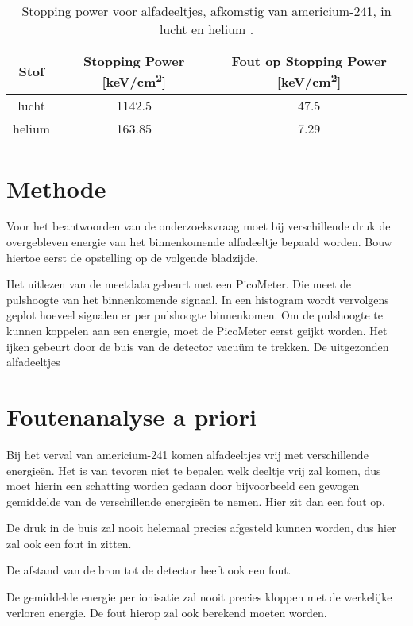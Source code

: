 \documentclass[11pt,a4paper]{article}
\begin{document}
\begin{table}
\caption{Stopping power voor alfadeeltjes, afkomstig van americium-241, in lucht \cite{StoppingPowerAir} en helium \cite{StoppingPowerHelium}.}
\centering
\begin{tabular}{SSS}
\toprule
{Stof} & {Stopping Power [\si{keV/cm^2}]} & {Fout op Stopping Power [\si{keV/cm^2}]} \\
\midrule
{lucht} &  1142.5 & 47.5\\
{helium} &  163.85 & 7.29\\
\bottomrule
\end{tabular}
\label{tab:table_2}
\end{table}

\section{Methode}
Voor het beantwoorden van de onderzoeksvraag moet bij verschillende druk de overgebleven energie van het binnenkomende alfadeeltje bepaald worden. Bouw hiertoe eerst de opstelling op de volgende bladzijde.\par
Het uitlezen van de meetdata gebeurt met een PicoMeter. Die meet de pulshoogte van het binnenkomende signaal. In een histogram wordt vervolgens geplot hoeveel signalen er per pulshoogte binnenkomen. Om de pulshoogte te kunnen koppelen aan een energie, moet de PicoMeter eerst geijkt worden.
Het ijken gebeurt door de buis van de detector vacuüm te trekken. De uitgezonden alfadeeltjes

\section{Foutenanalyse a priori}
Bij het verval van americium-241 komen alfadeeltjes vrij met verschillende energieën. Het is van tevoren niet te bepalen welk deeltje vrij zal komen, dus moet hierin een schatting worden gedaan door bijvoorbeeld een gewogen gemiddelde van de verschillende energieën te nemen. Hier zit dan een fout op. \par
De druk in de buis zal nooit helemaal precies afgesteld kunnen worden, dus hier zal ook een fout in zitten. \par
De afstand van de bron tot de detector heeft ook een fout. \par
De gemiddelde energie per ionisatie zal nooit precies kloppen met de werkelijke verloren energie. De fout hierop zal ook berekend moeten worden. \par
\end{document}

